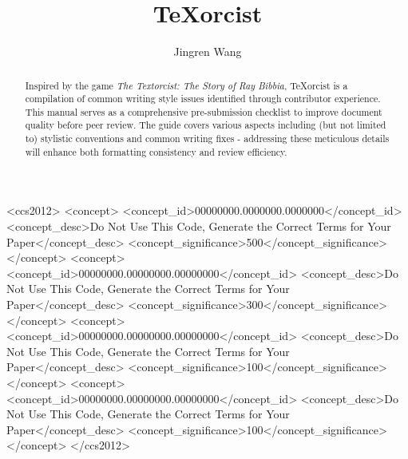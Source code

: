 \documentclass[acmsmall,screen,review]{acmart}
\begin{document}
\title{TeXorcist}

\author{Jingren Wang}



\begin{abstract}
    Inspired by the game \textit{The Textorcist: The Story of Ray Bibbia}, TeXorcist is a compilation of common writing style issues identified through contributor experience. This manual serves as a comprehensive pre-submission checklist to improve document quality before peer review. The guide covers various aspects including (but not limited to) stylistic conventions and common writing fixes - addressing these meticulous details will enhance both formatting consistency and review efficiency.
\end{abstract}

\begin{CCSXML}
<ccs2012>
 <concept>
  <concept_id>00000000.0000000.0000000</concept_id>
  <concept_desc>Do Not Use This Code, Generate the Correct Terms for Your Paper</concept_desc>
  <concept_significance>500</concept_significance>
 </concept>
 <concept>
  <concept_id>00000000.00000000.00000000</concept_id>
  <concept_desc>Do Not Use This Code, Generate the Correct Terms for Your Paper</concept_desc>
  <concept_significance>300</concept_significance>
 </concept>
 <concept>
  <concept_id>00000000.00000000.00000000</concept_id>
  <concept_desc>Do Not Use This Code, Generate the Correct Terms for Your Paper</concept_desc>
  <concept_significance>100</concept_significance>
 </concept>
 <concept>
  <concept_id>00000000.00000000.00000000</concept_id>
  <concept_desc>Do Not Use This Code, Generate the Correct Terms for Your Paper</concept_desc>
  <concept_significance>100</concept_significance>
 </concept>
</ccs2012>
\end{CCSXML}
\end{document}
